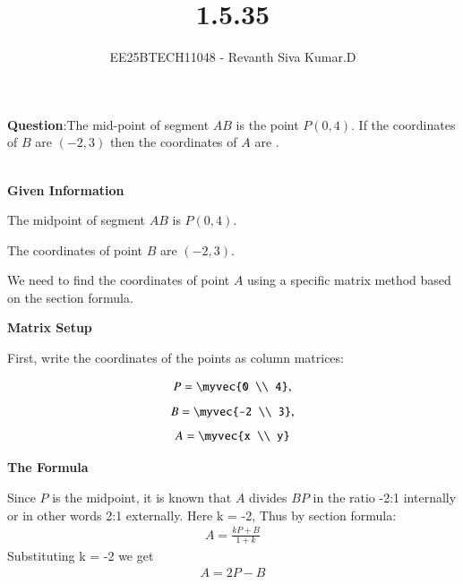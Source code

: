 \documentclass[journal]{IEEEtran}
\begin{document}
	
	
	\vspace{3cm}
	
	\title{1.5.35}
	\author{EE25BTECH11048 - Revanth Siva Kumar.D}
	\maketitle
	{\let\newpage\relax\maketitle}
	
	\renewcommand{\thefigure}{\theenumi}
	\renewcommand{\thetable}{\theenumi}
	\setlength{\intextsep}{10pt} %
	
	
	\renewcommand{\thetable}{\theenumi}
	
	\textbf{Question}:The mid-point of segment $AB$ is the point $P(0,4)$. If the coordinates of $B$ are $(-2,3)$ then the coordinates of $A$ are \underline{\hspace{1.5cm}}. 

\solution\\\textbf{Given Information}  

The midpoint of segment $AB$ is $P(0,4)$.  

The coordinates of point $B$ are $(-2,3)$.  

We need to find the coordinates of point $A$ using a specific matrix method based on the section formula.  

\textbf{Matrix Setup}  

First, write the coordinates of the points as column matrices:  

\begin{align*}
    P = \myvec{0 \\ 4}, 
\end{align*}
\begin{align*}
    B = \myvec{-2 \\ 3}, 
\end{align*}
\begin{align*}
    A = \myvec{x \\ y}
\end{align*}



\textbf{The Formula}  

Since $P$ is the midpoint, it is known that $A$ divides $BP$ in the ratio -2:1 internally or in other words 2:1 externally.
Here k = -2, Thus by section formula:
\begin{align*}
A = \frac{kP+B}{1+k}
\end{align*}
Substituting k = -2 we get
\begin{align*}
    A = 2P - B
\end{align*}
\end{document}
